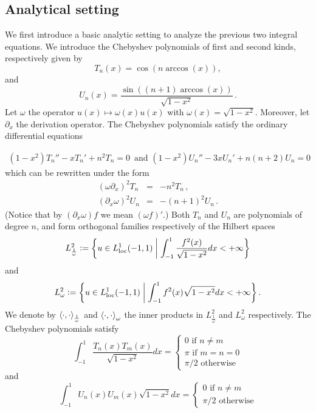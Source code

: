 \documentclass[a4paper]{article}
\begin{document}
\subsection{Analytical setting}

We first introduce a basic analytic setting to analyze the previous two integral equations.	We introduce the Chebyshev polynomials of first and second kinds, respectively given by 
\[T_n(x) = \cos(n \arccos(x)),\]
and 
\[U_n(x) = \dfrac{\sin((n+1) \arccos(x))}{\sqrt{1 - x^2}}\,.\]
Let $\omega$ the operator $u(x) \mapsto \omega(x)u(x)$ with $\omega(x) = \sqrt{1 - x^2}$. Moreover, let $\partial_x$ the derivation operator. The Chebyshev polynomials satisfy
the ordinary differential equations

\begin{eqnarray*}
	(1-x^2)T_n'' -xT_n' +n^2T_n =0\,\mbox{ and }(1-x^2)U_n'' -3xU_n' +n(n+2)U_n =0
\end{eqnarray*}
which can be rewritten under the form
\begin{eqnarray}
	(\omega\partial_x)^2 T_n &=& -n^2T_n\,, \label{cheb1}\\
	(\partial_x\omega)^2 U_n &=& -(n+1)^2U_n\, .\label{cheb2}
\end{eqnarray}
(Notice that by $(\partial_x\omega) f$ we mean $(\omega f)'$.) Both $T_n$ and $U_n$ are polynomials of degree $n$, and form orthogonal families respectively of the Hilbert spaces 
$$L^2_{\frac{1}{\omega}} \mathrel{\mathop:}= \left\{u \in L^1_\textup{loc}(-1,1)\mathrel{}\middle|\mathrel{}\int_{-1}^{1} \dfrac{f^2(x)}{\sqrt{1 - x^2} }dx< + \infty\right\}$$
and 
$$L^2_{\omega} \mathrel{\mathop:}= \left\{u \in L^1_\textup{loc}(-1,1)\mathrel{}\middle|\mathrel{}\int_{-1}^{1} {f^2(x)}{\sqrt{1 - x^2} }dx< + \infty\right\}.$$
We denote by $\left\langle \cdot,\cdot\right\rangle_\frac{1}{\omega}$ and $\left\langle \cdot,\cdot\right\rangle_\omega$ the inner products in $L^2_{\frac{1}{\omega}}$ and $L^2_{\omega}$ respectively.
The Chebyshev polynomials satisfy
\begin{equation}
	\int_{-1}^1  \dfrac{T_n(x)T_m(x)}{\sqrt{1 - x^2} }dx = \left\{
	\begin{array}{l}
	0 \mbox{ if } n\ne m\\
	\pi \mbox{ if } m=n=0\\
	\pi/2 \mbox{ otherwise}
	\end{array} 
	\right.
\end{equation}
	and
\begin{equation}
	\int_{-1}^1  U_n(x)U_m(x)\sqrt{1 - x^2} dx = \left\{
	\begin{array}{l}
	0 \mbox{ if } n\ne m\\
	\pi/2 \mbox{ otherwise}
	\end{array} 
	\right.
\end{equation}
\end{document}
